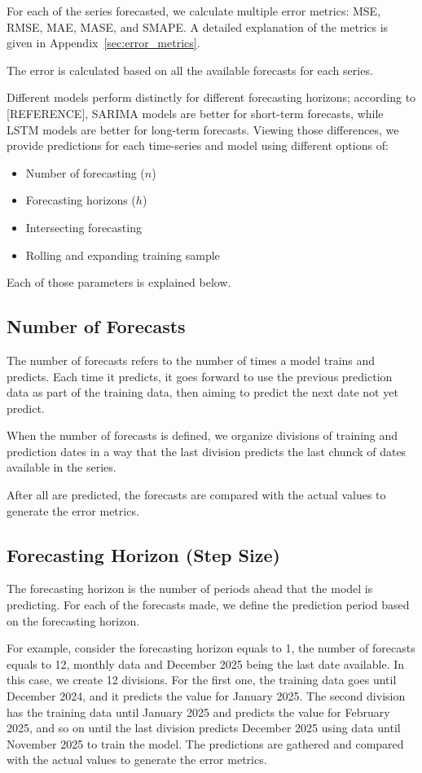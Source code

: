 For each of the series forecasted, we calculate multiple error metrics: MSE, RMSE, MAE, MASE, and SMAPE. A detailed explanation of the metrics is given in Appendix~\ref{sec:error_metrics}.

The error is calculated based on all the available forecasts for each series.

Different models perform distinctly for different forecasting horizons; according to [REFERENCE], SARIMA models are better for short-term forecasts, while LSTM models are better for long-term forecasts. Viewing those differences, we provide predictions for each time-series and model using different options of:
\begin{itemize}
    \item Number of forecasting ($n$)
    \item Forecasting horizons ($h$)
    \item Intersecting forecasting
    \item Rolling and expanding training sample
\end{itemize}
Each of those parameters is explained below.

\subsection{Number of Forecasts}

The number of forecasts refers to the number of times a model trains and predicts. Each time it predicts, it goes forward to use the previous prediction data as part of the training data, then aiming to predict the next date not yet predict.

When the number of forecasts is defined, we organize divisions of training and prediction dates in a way that the last division predicts the last chunck of dates available in the series.

After all are predicted, the forecasts are compared with the actual values to generate the error metrics.

\subsection{Forecasting Horizon (Step Size)}

The forecasting horizon is the number of periods ahead that the model is predicting. For each of the forecasts made, we define the prediction period based on the forecasting horizon.

For example, consider the forecasting horizon equals to 1, the number of forecasts equals to 12, monthly data and December 2025 being the last date available. In this case, we create 12 divisions. For the first one, the training data goes until December 2024, and it predicts the value for January 2025. The second division has the training data until January 2025 and predicts the value for February 2025, and so on until the last division predicts December 2025 using data until November 2025 to train the model. The predictions are gathered and compared with the actual values to generate the error metrics.

